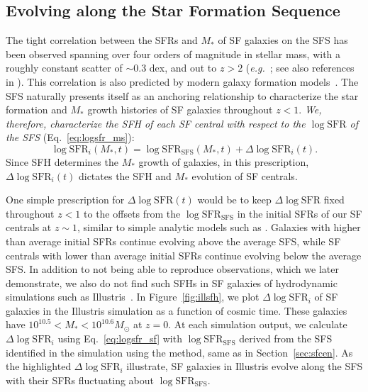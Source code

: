\documentclass[12pt, letterpaper, preprint, tighten]{aastex62}
\newcommand{\beq}{\begin{equation}}
\newcommand{\eeq}{\end{equation}}
\newcommand{\logsfr}{\log\mathrm{SFR}}
\newcommand{\logsfrsfs}{\log\mathrm{SFR}_\mathrm{SFS}}
\begin{document}
\subsection{Evolving along the Star Formation Sequence} \label{sec:modelevol}
The tight correlation between the SFRs and $M_*$ of SF galaxies on 
the SFS has been observed spanning over four orders of magnitude
in stellar mass, with a roughly constant scatter of ${\sim}0.3$ dex, and out
to $z > 2$
(\emph{e.g.}~\citealt{noeske2007,daddi2007,elbaz2007,salim2007,santini2009,karim2011,whitaker2012,moustakas2013,lee2015}; see also references in \citealt{speagle2014}).
This correlation is also predicted by modern galaxy formation models~\citep[][see
\citealt{hahn2018a} and references therein]{somerville2015}. The SFS
naturally presents itself as an anchoring relationship to characterize
the star formation and $M_*$ growth histories of SF galaxies throughout $z < 1$. 
\emph{We, therefore, characterize the SFH of each SF central with respect to 
the $\logsfr$ of the SFS} (Eq.~\ref{eq:logsfr_ms}):
\beq \label{eq:logsfr_sf}
\logsfr_i(M_*, t) = \logsfrsfs(M_*, t) + \Delta\logsfr_i(t).
\eeq
Since SFH determines the $M_*$ growth of galaxies, in this prescription,
$\Delta \logsfr_i(t)$ dictates the SFH and $M_*$ evolution of SF centrals.

One simple prescription for $\Delta \logsfr(t)$ would be to keep $\Delta \logsfr$
fixed throughout $z < 1$ to the offsets from the $\logsfrsfs$ in the
initial SFRs of our SF centrals at $z\sim1$, similar to simple analytic
models such as \cite{mitra2015}. Galaxies with higher than average
initial SFRs continue evolving above the average SFS, while SF centrals
with lower than average initial SFRs continue evolving below the average
SFS. In addition to not being able to reproduce observations, which we
later demonstrate, we also do not find such SFHs in SF galaxies of
hydrodynamic simulations such as Illustris~\citep{vogelsberger2014,genel2014}.
In Figure~\ref{fig:illsfh}, we plot $\Delta \logsfr_i$ of SF 
galaxies in the Illustris simulation as a function of cosmic time. These
galaxies have $10^{10.5} < M_* < 10^{10.6}M_\odot$ at $z=0$.
At each simulation output, we calculate $\Delta \logsfr_i$ using Eq.~\ref{eq:logsfr_sf}
with $\logsfrsfs$ derived from the SFS identified in the simulation
using the \cite{hahn2018a} method, same as in Section~\ref{sec:sfcen}. As the
highlighted $\Delta \logsfr_i$ illustrate, SF galaxies in Illustris evolve
along the SFS with their SFRs fluctuating about $\logsfrsfs$.
\end{document}
